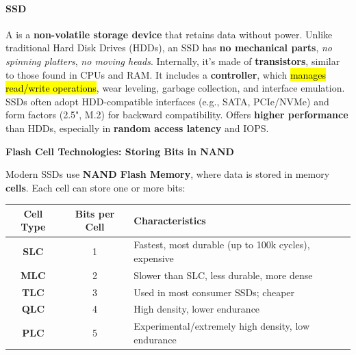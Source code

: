 \newpage

\paragraph{SSD}\label{paragraph: SSD}

A  is a \textbf{non-volatile storage device} that retains data without power. Unlike traditional Hard Disk Drives (HDDs), an SSD has \textbf{no mechanical parts}, \emph{no spinning platters}, \emph{no moving heads}. Internally, it's made of \textbf{transistors}, similar to those found in CPUs and RAM. It includes a \textbf{controller}, which \hl{manages read/write operations}, wear leveling, garbage collection, and interface emulation. SSDs often adopt HDD-compatible interfaces (e.g., SATA, PCIe/NVMe) and form factors (2.5", M.2) for backward compatibility. Offers \textbf{higher performance} than HDDs, especially in \textbf{random access latency} and IOPS.

\highspace
\begin{flushleft}
    \textcolor{Green3}{\faIcon{\speedIcon} \textbf{Flash Cell Technologies: Storing Bits in NAND}}
\end{flushleft}
Modern SSDs use \textbf{NAND Flash Memory}, where data is stored in memory \textbf{cells}. Each cell can store one or more bits:

\begin{table}[!htp]
    \centering
    \begin{adjustbox}{width={\textwidth},totalheight={\textheight},keepaspectratio}
        \begin{tabular}{@{} c | c | l @{}}
            \toprule
            Cell Type & Bits per Cell & Characteristics \\
            \midrule
            \textbf{SLC} & 1 & Fastest, most durable (up to 100k cycles), expensive \\ [.3em]
            \textbf{MLC} & 2 & Slower than SLC, less durable, more dense            \\ [.3em]
            \textbf{TLC} & 3 & Used in most consumer SSDs; cheaper                  \\ [.3em]
            \textbf{QLC} & 4 & High density, lower endurance                        \\ [.3em]
            \textbf{PLC} & 5 & Experimental/extremely high density, low endurance   \\
            \bottomrule
        \end{tabular}
    \end{adjustbox}
\end{table}

